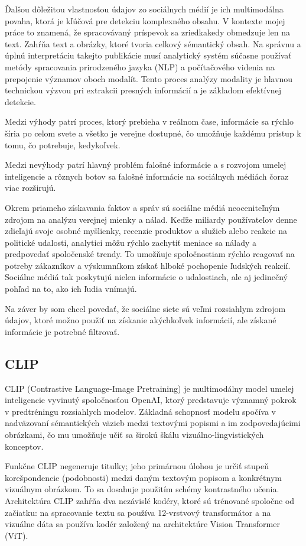 \documentclass[]{tukediphc}
\begin{document}
Ďalšou dôležitou vlastnosťou údajov zo sociálnych médií je ich multimodálna povaha, ktorá je kľúčová pre detekciu komplexného obsahu. V kontexte mojej práce to znamená, že spracovávaný príspevok sa zriedkakedy obmedzuje len na text. Zahŕňa text a obrázky, ktoré tvoria celkový sémantický obsah. Na správnu a úplnú interpretáciu takejto publikácie musí analytický systém súčasne používať metódy spracovania prirodzeného jazyka (NLP) a počítačového videnia na prepojenie významov oboch modalít. Tento proces analýzy modality je hlavnou technickou výzvou pri extrakcii presných informácií a je základom efektívnej detekcie.

Medzi výhody patrí proces, ktorý prebieha v reálnom čase, informácie sa rýchlo šíria po celom svete a všetko je verejne dostupné, čo umožňuje každému prístup k tomu, čo potrebuje, kedykoľvek.

Medzi nevýhody patrí hlavný problém falošné informácie a s rozvojom umelej inteligencie a rôznych botov sa falošné informácie na sociálnych médiách čoraz viac rozširujú. 

Okrem priameho získavania faktov a správ sú sociálne médiá neoceniteľným zdrojom na analýzu verejnej mienky a nálad. Keďže miliardy používateľov denne zdieľajú svoje osobné myšlienky, recenzie produktov a služieb alebo reakcie na politické udalosti, analytici môžu rýchlo zachytiť meniace sa nálady a predpovedať spoločenské trendy. To umožňuje spoločnostiam rýchlo reagovať na potreby zákazníkov a výskumníkom získať hlboké pochopenie ľudských reakcií. Sociálne médiá tak poskytujú nielen informácie o udalostiach, ale aj jedinečný pohľad na to, ako ich ľudia vnímajú.

Na záver by som chcel povedať, že sociálne siete sú veľmi rozsiahlym zdrojom údajov, ktoré možno použiť na získanie akýchkoľvek informácií, ale získané informácie je potrebné filtrovať.


\subsection{CLIP}

CLIP (Contrastive Language-Image Pretraining) je multimodálny model umelej inteligencie vyvinutý spoločnosťou OpenAI, ktorý predstavuje významný pokrok v predtréningu rozsiahlych modelov. Základná schopnosť modelu spočíva v nadväzovaní sémantických väzieb medzi textovými popismi a im zodpovedajúcimi obrázkami, čo mu umožňuje učiť sa širokú škálu vizuálno-lingvistických konceptov.

Funkčne CLIP negeneruje titulky; jeho primárnou úlohou je určiť stupeň korešpondencie (podobnosti) medzi daným textovým popisom a konkrétnym vizuálnym obrázkom. To sa dosahuje použitím schémy kontrastného učenia. Architektúra CLIP zahŕňa dva nezávislé kodéry, ktoré sú trénované spoločne od začiatku: na spracovanie textu sa používa 12-vrstvový transformátor a na vizuálne dáta sa používa kodér založený na architektúre Vision Transformer (ViT).\cite{arxiv:blip2}
\end{document}
